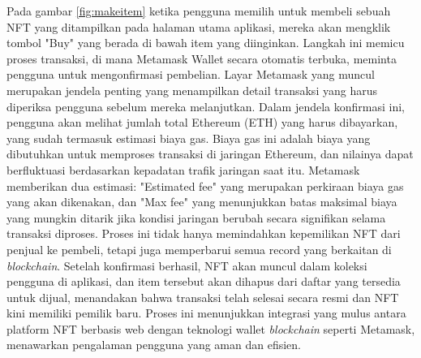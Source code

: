 Pada gambar \ref{fig:makeitem} ketika pengguna memilih untuk membeli sebuah NFT yang ditampilkan pada halaman utama aplikasi, mereka akan mengklik tombol "Buy" yang berada di bawah item yang diinginkan. Langkah ini memicu proses transaksi, di mana Metamask Wallet secara otomatis terbuka, meminta pengguna untuk mengonfirmasi pembelian. Layar Metamask yang muncul merupakan jendela penting yang menampilkan detail transaksi yang harus diperiksa pengguna sebelum mereka melanjutkan. Dalam jendela konfirmasi ini, pengguna akan melihat jumlah total Ethereum (ETH) yang harus dibayarkan, yang sudah termasuk estimasi biaya gas. Biaya gas ini adalah biaya yang dibutuhkan untuk memproses transaksi di jaringan Ethereum, dan nilainya dapat berfluktuasi berdasarkan kepadatan trafik jaringan saat itu. Metamask memberikan dua estimasi: "Estimated fee" yang merupakan perkiraan biaya gas yang akan dikenakan, dan "Max fee" yang menunjukkan batas maksimal biaya yang mungkin ditarik jika kondisi jaringan berubah secara signifikan selama transaksi diproses. Proses ini tidak hanya memindahkan kepemilikan NFT dari penjual ke pembeli, tetapi juga memperbarui semua record yang berkaitan di \emph{blockchain}. Setelah konfirmasi berhasil, NFT akan muncul dalam koleksi pengguna di aplikasi, dan item tersebut akan dihapus dari daftar yang tersedia untuk dijual, menandakan bahwa transaksi telah selesai secara resmi dan NFT kini memiliki pemilik baru. Proses ini menunjukkan integrasi yang mulus antara platform NFT berbasis web dengan teknologi wallet \emph{blockchain} seperti Metamask, menawarkan pengalaman pengguna yang aman dan efisien.
    
